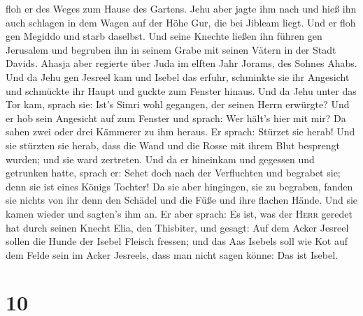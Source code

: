 floh er des Weges zum Hause des Gartens. Jehu aber jagte ihm nach und
hieß ihn auch schlagen in dem Wagen auf der Höhe Gur, die bei Jibleam
liegt. Und er floh gen Megiddo und starb daselbst.  Und
seine Knechte ließen ihn führen gen Jerusalem und begruben ihn in seinem
Grabe mit seinen Vätern in der Stadt Davids.  Ahasja aber
regierte über Juda im elften Jahr Jorams, des Sohnes Ahabs.
 Und da Jehu gen Jesreel kam und Isebel das erfuhr,
schminkte sie ihr Angesicht und schmückte ihr Haupt und guckte zum
Fenster hinaus.  Und da Jehu unter das Tor kam, sprach
sie: Ist's Simri wohl gegangen, der seinen Herrn erwürgte?
 Und er hob sein Angesicht auf zum Fenster und sprach:
Wer hält's hier mit mir? Da sahen zwei oder drei Kämmerer zu ihm heraus.
 Er sprach: Stürzet sie herab! Und sie stürzten sie
herab, dass die Wand und die Rosse mit ihrem Blut besprengt wurden; und
sie ward zertreten.  Und da er hineinkam und gegessen und
getrunken hatte, sprach er: Sehet doch nach der Verfluchten und begrabet
sie; denn sie ist eines Königs Tochter!  Da sie aber
hingingen, sie zu begraben, fanden sie nichts von ihr denn den Schädel
und die Füße und ihre flachen Hände.  Und sie kamen
wieder und sagten's ihm an. Er aber sprach: Es ist, was der
\textsc{Herr} geredet hat durch seinen Knecht Elia, den Thisbiter, und
gesagt: Auf dem Acker Jesreel sollen die Hunde der Isebel Fleisch
fressen;  und das Aas Isebels soll wie Kot auf dem Felde
sein im Acker Jesreels, dass man nicht sagen könne: Das ist Isebel.

\hypertarget{section-9}{%
\section{10}\label{section-9}}

